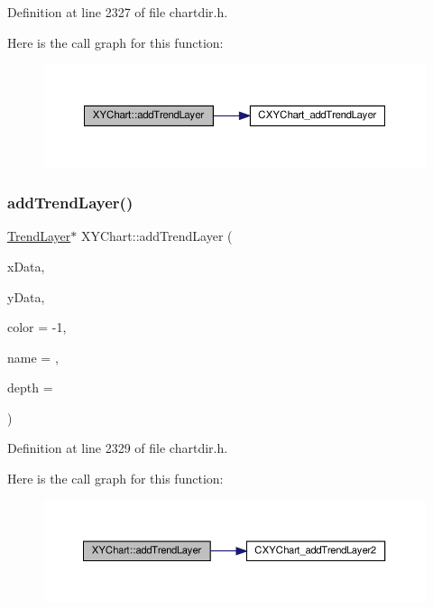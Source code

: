 Definition at line 2327 of file chartdir.\+h.

Here is the call graph for this function\+:
\nopagebreak
\begin{figure}[H]
\begin{center}
\leavevmode
\includegraphics[width=350pt]{class_x_y_chart_ab6eacb1530fecf9d3498b6880c5f1944_cgraph}
\end{center}
\end{figure}
\mbox{\label{class_x_y_chart_ae9624399cb7a23fc40f2321706766a25}} 
\subsubsection{\texorpdfstring{add\+Trend\+Layer()}{addTrendLayer()}\hspace{0.1cm}{\footnotesize\ttfamily [2/2]}}
{\footnotesize\ttfamily \hyperlink{class_trend_layer}{Trend\+Layer}$\ast$ X\+Y\+Chart\+::add\+Trend\+Layer (\begin{DoxyParamCaption}\item[{\hyperlink{class_double_array}{Double\+Array}}]{x\+Data,  }\item[{\hyperlink{class_double_array}{Double\+Array}}]{y\+Data,  }\item[{int}]{color = {\ttfamily -\/1},  }\item[{const char $\ast$}]{name = {},  }\item[{int}]{depth = {} }\end{DoxyParamCaption})\hspace{0.3cm}{\ttfamily [inline]}}



Definition at line 2329 of file chartdir.\+h.

Here is the call graph for this function\+:
\nopagebreak
\begin{figure}[H]
\begin{center}
\leavevmode
\includegraphics[width=350pt]{class_x_y_chart_ae9624399cb7a23fc40f2321706766a25_cgraph}
\end{center}
\end{figure}
\mbox{\label{class_x_y_chart_aa353997d175e029e1e1269729a7d987a}} 

